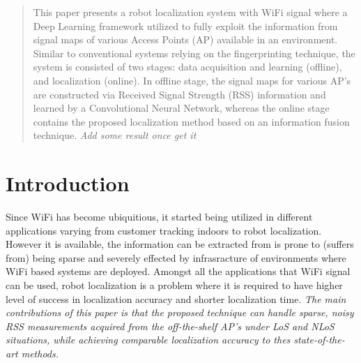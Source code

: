\documentclass[conference]{IEEEtran}
\begin{document}




\maketitle

\begin{abstract}
    This paper presents a robot localization system with WiFi signal where a Deep Learning framework utilized to fully exploit the information from signal maps of various Access Points (AP) available in an environment.
    Similar to conventional systems relying on the fingerprinting technique, the system is consisted of two stages: data acquisition and learning (offline), and localization (online).
    In offline stage, the signal maps for various AP's are constructed via Received Signal Strength (RSS) information and learned by a Convolutional Neural Network, whereas the online stage contains the proposed localization method based on an information fusion technique.
    \textit{Add some result once get it}
\end{abstract}





%
\IEEEpeerreviewmaketitle



\section{Introduction}

  Since WiFi has become ubiquitious, it started being utilized in different applications varying from customer tracking indoors to robot localization. %
  However it is available, the information can be extracted from is prone to (suffers from) being sparse and severely effected by infrasracture of environments where WiFi based systems are deployed.
  Amongst all the applications that WiFi signal can be used, robot localization is a problem where it is required to have higher level of success in localization accuracy and shorter localization time.
  \textit{The main contributions of this paper is that the proposed technique can handle sparse, noisy RSS measurements acquired from the off-the-shelf AP's under LoS and NLoS situations, while achieving comparable localization accuracy to thes state-of-the-art methods.}
\end{document}

